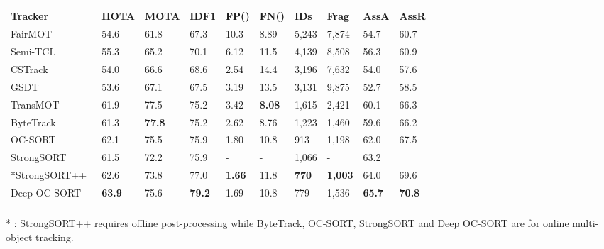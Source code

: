 \documentclass{article}
\newcommand*{\belowrulesepcolor}[1]{\noalign{\kern-\belowrulesep 
    \begingroup 
      \color{#1}\hrule height\belowrulesep 
    \endgroup 
  }}
\newcommand*{\aboverulesepcolor}[1]{\noalign{\begingroup 
      \color{#1}\hrule height\aboverulesep 
    \endgroup 
    \kern-\aboverulesep 
  }}
\begin{document}
\begin{table*}[t]
\begin{tabular}{ l | p{20px}p{20px}p{20px}p{27px} p{27px}p{22px}p{22px}p{20px}p{20px}}
\\
\aboverulesepcolor{gray!20} 
\midrule
Tracker &  HOTA & MOTA & IDF1 &  FP({\footnotesize }) & FN({\footnotesize }) & IDs & Frag & AssA & AssR \\
\midrule
FairMOT~\cite{zhang2021fairmot} & 54.6 & 61.8 & 67.3 & 10.3 & 8.89 & 5,243 & 7,874 & 54.7 & 60.7 \\
Semi-TCL~\cite{li2021semitcl} & 55.3 & 65.2 & 70.1 & 6.12 & 11.5 & 4,139 & 8,508 & 56.3 & 60.9 \\
CSTrack~\cite{cstrack} & 54.0 & 66.6 & 68.6  & 2.54 & 14.4 & 3,196 & 7,632 &  54.0 & 57.6 \\
GSDT~\cite{gsdt} & 53.6 & 67.1 & 67.5  & 3.19 & 13.5 & 3,131 & 9,875 & 52.7 & 58.5 \\
TransMOT~\cite{chu2021transmot} & 61.9 & 77.5 & 75.2 & 3.42 & \textbf{8.08} & 1,615 & 2,421 & 60.1 & 66.3 \\
\midrule
\belowrulesepcolor{babyblue!20} 
\rowcolor{babyblue!20} ByteTrack~\cite{bytetrack} & 61.3 & \textbf{77.8} & 75.2 &  2.62 & 8.76 & 1,223 & 1,460 & 59.6 & 66.2\\
\rowcolor{babyblue!20}OC-SORT~\cite{cao2022observation} & 62.1 & 75.5 & 75.9 &  1.80 & 10.8& 913 & 1,198& 62.0 & 67.5 \\
\rowcolor{babyblue!20}StrongSORT~\cite{strongsort} & 61.5 & 72.2 & 75.9 & - & - & 1,066 & - & 63.2 &  \\ 
\rowcolor{babyblue!20}*StrongSORT++~\cite{strongsort} & 62.6 & 73.8 & 77.0 & \textbf{1.66} & 11.8 & \textbf{770} & \textbf{1,003} & 64.0 & 69.6 \\
\rowcolor{babyblue!20}Deep OC-SORT & \textbf{63.9} & 75.6 & \textbf{79.2} & 1.69 & 10.8 & 779 & 1,536 & \textbf{65.7} & \textbf{70.8}\\
\aboverulesepcolor{babyblue!20}
\bottomrule
\end{tabular}
\begin{center}\scriptsize
\vspace{-0.4cm}
\item[*]: StrongSORT++ requires offline post-processing while ByteTrack, OC-SORT, StrongSORT and Deep OC-SORT are for online multi-object tracking.
\end{center}
\label{table:mot17}
\vspace{-0.5cm}
\end{table*}
\end{document}
